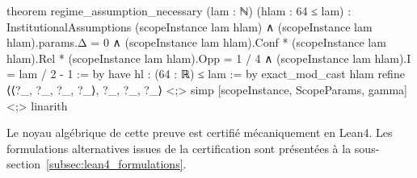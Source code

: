 \begin{sloppypar}
\begin{leancode}[caption={T\'emoin de port\'ee, instance hors du r\'egime}, label={lst:lean4_scope_instance}]
theorem regime_assumption_necessary (lam : ℕ) (hlam : 64 ≤ lam) :
    InstitutionalAssumptions (scopeInstance lam hlam) ∧
    (scopeInstance lam hlam).params.Δ = 0 ∧
    (scopeInstance lam hlam).Conf * (scopeInstance lam hlam).Rel *
      (scopeInstance lam hlam).Opp = 1 / 4 ∧
    (scopeInstance lam hlam).I = lam / 2 - 1 := by
  have hl : (64 : ℝ) ≤ lam := by exact_mod_cast hlam
  refine ⟨⟨?_, ?_, ?_, ?_⟩, ?_, ?_, ?_⟩ <;>
    simp [scopeInstance, ScopeParams, gamma] <;> linarith
\end{leancode}

\begin{remark}
\label{rem:statut_verification_lean4}
Le noyau alg\'ebrique de cette preuve est certifi\'e m\'ecaniquement en
Lean4. Les formulations alternatives issues de la certification sont
pr\'esent\'ees \`a la sous-section~\ref{subsec:lean4_formulations}.
\end{remark}
\end{sloppypar}


